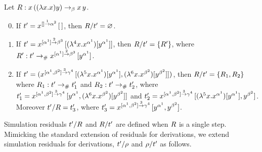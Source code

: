 \begin{example}
Let $R : x\,((\lambda x. x)y) \mathrel{\to_\beta} x\,y$.
\begin{enumerate}
\setcounter{enumi}{-1}
\item If $t' = x^{[] \overset{1}{\to} \alpha^2}\,[\,]$, then $R/t' = \varnothing$.
\item If $t' = x^{[\alpha^1] \overset{2}{\to} \beta^3}\,[(\lambda^{4} x. x^{\alpha^1})[y^{\alpha^1}]]$, then $R/t' = \{R'\}$,
      where
      $R' : t' \mathrel{\to_{\mathtt{\#}}} x^{[\alpha^1] \overset{2}{\to} \beta^3}\,[y^{\alpha^1}]$.
\item If $t' = (x^{[\alpha^1,\beta^2] \overset{3}{\to} \gamma^4}\,[
                    (\lambda^{5} x. x^{\alpha^1})[y^{\alpha^1}],
                    (\lambda^{6} x. x^{\beta^2})[y^{\beta^2}]
                  ])$,
      then
      $R/t' = \{R_1,R_2\}$
      where
      $R_1 : t' \mathrel{\to_{\mathtt{\#}}} t'_1$
      and
      $R_2 : t' \mathrel{\to_{\mathtt{\#}}} t'_2$,
      where $
      t'_1 = x^{[\alpha^1,\beta^2] \overset{3}{\to} \gamma^4}\,[
                 y^{\alpha^1},
                 (\lambda^{6} x. x^{\beta^2})[y^{\beta^2}]
               ]
      $ and $
      t'_2 = x^{[\alpha^1,\beta^2] \overset{3}{\to} \gamma^4}\,[
                 (\lambda^{5} x. x^{\alpha^1})[y^{\alpha^1}],
                 y^{\beta^2}
               ]
      $.
      Moreover $t'/R = t'_3$,
      where $
        t'_3 = x^{[\alpha^1,\beta^2] \overset{3}{\to} \gamma^4}\,[
                   y^{\alpha^1},
                   y^{\beta^2}
                 ]
      $.
\end{enumerate}
\end{example}

\bigskip

Simulation residuals $t'/R$ and $R/t'$ are defined when $R$ is a single step.
Mimicking the standard extension of residuals for derivations,
we extend simulation residuals for derivations,
\ie $t'/\rho$ and $\rho/t'$ as follows.


